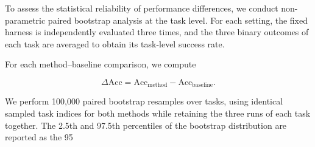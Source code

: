 \documentclass{article} %
\begin{document}


To assess the statistical reliability of performance differences, we conduct non-parametric paired bootstrap analysis at the task level. For each setting, the fixed harness is independently evaluated three times, and the three binary outcomes of each task are averaged to obtain its task-level success rate.

For each method--baseline comparison, we compute

$$
\Delta \mathrm{Acc}
=
\mathrm{Acc}_{\mathrm{method}}
-
\mathrm{Acc}_{\mathrm{baseline}}.
$$

We perform 100,000 paired bootstrap resamples over tasks, using identical sampled task indices for both methods while retaining the three runs of each task together. The 2.5th and 97.5th percentiles of the bootstrap distribution are reported as the 95%
\end{document}
